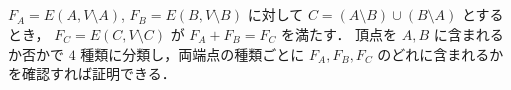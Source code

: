 \subsection{}
$F_A = E(A, V\setminus A)$, $F_B = E(B, V\setminus B)$ に対して $C = (A\setminus B) \cup (B\setminus A)$ とするとき，
$F_C = E(C, V\setminus C)$ が $F_A + F_B = F_C$ を満たす．
頂点を $A, B$ に含まれるか否かで $4$ 種類に分類し，両端点の種類ごとに $F_A, F_B, F_C$ のどれに含まれるかを確認すれば証明できる．
